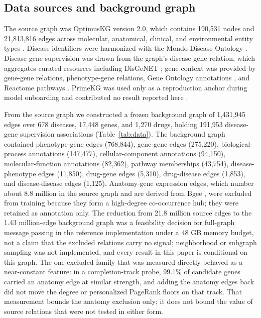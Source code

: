 \documentclass[11pt]{article}
\begin{document}
\subsection{Data sources and background graph}

The source graph was OptimusKG version 2.0, which contains 190,531 nodes and 21,813,816 edges across molecular, anatomical, clinical, and environmental entity types \cite{vittor2026}. Disease identifiers were harmonized with the Mondo Disease Ontology \cite{vasilevsky2022}. Disease-gene supervision was drawn from the graph's disease-gene relation, which aggregates curated resources including DisGeNET \cite{pineiro2020}; gene context was provided by gene-gene relations, phenotype-gene relations, Gene Ontology annotations \cite{ashburner2000}, and Reactome pathways \cite{jassal2020}. PrimeKG was used only as a reproduction anchor during model onboarding and contributed no result reported here \cite{chandak2023}.

From the source graph we constructed a frozen background graph of 1,431,945 edges over 678 diseases, 17,448 genes, and 1,270 drugs, holding 191,953 disease-gene supervision associations (Table~\ref{tab:data}). The background graph contained phenotype-gene edges (768,844), gene-gene edges (275,220), biological-process annotations (147,477), cellular-component annotations (94,150), molecular-function annotations (82,362), pathway memberships (43,754), disease-phenotype edges (11,850), drug-gene edges (5,310), drug-disease edges (1,853), and disease-disease edges (1,125). Anatomy-gene expression edges, which number about 8.8 million in the source graph and are derived from Bgee \cite{bastian2021}, were excluded from training because they form a high-degree co-occurrence hub; they were retained as annotation only. The reduction from 21.8 million source edges to the 1.43 million-edge background graph was a feasibility decision for full-graph message passing in the reference implementation under a 48 GB memory budget, not a claim that the excluded relations carry no signal; neighborhood or subgraph sampling was not implemented, and every result in this paper is conditional on this graph. The one excluded family that was measured directly behaved as a near-constant feature: in a completion-track probe, 99.1\% of candidate genes carried an anatomy edge at similar strength, and adding the anatomy edges back did not move the degree or personalized PageRank floors on that track. That measurement bounds the anatomy exclusion only; it does not bound the value of source relations that were not tested in either form.
\end{document}
